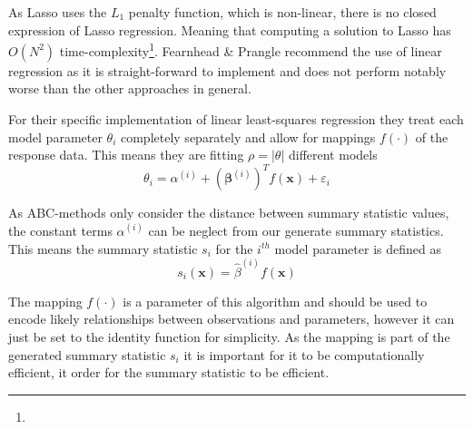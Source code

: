 \documentclass[bibliography=totoc,11pt,a4paper,margin=0]{article}
\theoremstyle{break}
\begin{document}
  \par As Lasso uses the $L_1$ penalty function, which is non-linear, there is no closed expression of Lasso regression. Meaning that computing a solution to Lasso has $O(N^2)$ time-complexity\footnote{}. Fearnhead \& Prangle recommend the use of linear regression as it is straight-forward to implement and does not perform notably worse than the other approaches in general.

  \par For their specific implementation of linear least-squares regression they treat each model parameter $\theta_i$ completely separately and allow for mappings $f(\cdot)$ of the response data. This means they are fitting $\rho=|\theta|$ different models
  \[ \theta_i=\alpha^{(i)}+(\pmb\beta^{(i)})^Tf(\mathbf{x})+\varepsilon_i \]
  \par As ABC-methods only consider the distance between summary statistic values, the constant terms $\alpha^{(i)}$ can be neglect from our generate summary statistics. This means the summary statistic $s_i$ for the $i^{th}$ model parameter is defined as
  \[ s_i(\mathbf{x})=\hat\beta^{(i)}f(\mathbf{x}) \]

  \par The mapping $f(\cdot)$ is a parameter of this algorithm and should be used to encode likely relationships between observations and parameters, however it can just be set to the identity function for simplicity. As the mapping is part of the generated summary statistic $s_i$ it is important for it to be computationally efficient, it order for the summary statistic to be efficient.
\end{document}

